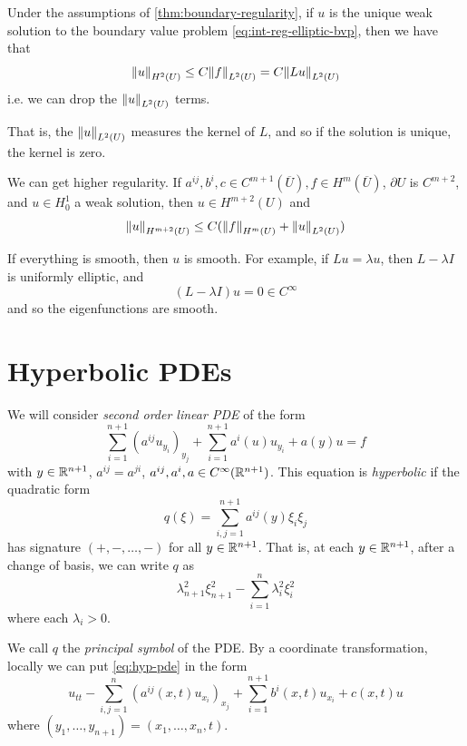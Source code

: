\documentclass{article}
\begin{document}
\begin{corollary}
    Under the assumptions of \cref{thm:boundary-regularity}, if \(u\) is the unique weak solution to the boundary value problem \cref{eq:int-reg-elliptic-bvp}, then we have that
    \[\norm{u}_{H^2(U)} \le C\norm{f}_{L^2(U)} = C\norm{Lu}_{L^2(U)}\]
    i.e. we can drop the \(\norm{u}_{L^2(U)}\) terms.
\end{corollary}

That is, the \(\norm{u}_{L^2(U)}\) measures the kernel of \(L\), and so if the solution is unique, the kernel is zero.

\begin{remark}
    We can get higher regularity. If \(a^{ij}, b^i, c \in C^{m+1}(\overline U), f \in H^m(\overline U)\), \(\partial U\) is \(C^{m+2}\),  and \(u \in H^1_0\) a weak solution, then \(u \in H^{m+2}(U)\) and
    \[\norm{u}_{H^{m+2}(U)} \le C(\norm{f}_{H^m(U)} + \norm{u}_{L^2(U)})\]
\end{remark}

\begin{remark}
    If everything is smooth, then \(u\) is smooth. For example, if \(Lu = \lambda u\), then \(L - \lambda I\) is uniformly elliptic, and
    \[(L - \lambda I)u  = 0 \in C^\infty\]
    and so the eigenfunctions are smooth.
\end{remark}

\section{Hyperbolic PDEs}

We will consider \emph{second order linear PDE} of the form
\begin{equation}
    \label{eq:hyp-pde}
    \sum_{i=1}^{n+1} (a^{ij}u_{y_i})_{y_j} + \sum_{i=1}^{n+1} a^i(u)u_{y_i} + a(y)u = f
\end{equation}
with \(y \in \mathbb{R}^{n+1}\), \(a^{ij} = a^{ji}\), \(a^{ij}, a^i, a \in C^\infty(\mathbb{R}^{n+1})\). This equation is \emph{hyperbolic} if the quadratic form
\[q(\xi) = \sum_{i, j=1}^{n+1}a^{ij}(y)\xi_i \xi_j\]
has signature \((+, -, \dots, -)\) for all \(y \in \mathbb{R}^{n+1}\). That is, at each \(y \in \mathbb{R}^{n+1}\), after a change of basis, we can write \(q\) as
\[\lambda_{n+1}^2\xi_{n+1}^2 - \sum_{i=1}^n \lambda_i^2\xi_i^2\]
where each \(\lambda_i > 0\).

We call \(q\) the \emph{principal symbol} of the PDE. By a coordinate transformation, locally we can put \cref{eq:hyp-pde} in the form
\begin{equation}
    \label{eq:hyperbolic-local-form}
    u_{tt} - \sum_{i, j=1}^n (a^{ij}(x, t)u_{x_i})_{x_j} + \sum_{i=1}^{n+1} b^i(x, t)u_{x_i} + c(x, t)u
\end{equation}
where \((y_1, \dots, y_{n+1}) = (x_1, \dots, x_n, t)\).
\end{document}
